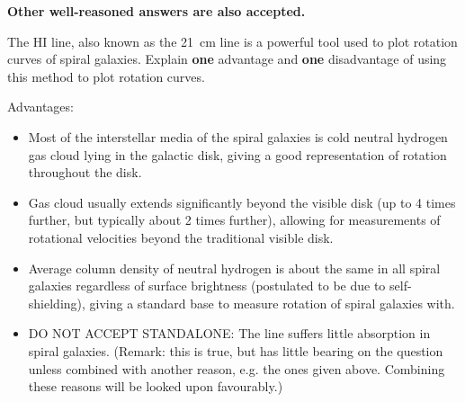 \documentclass[a4paper,11pt]{exam}
\begin{document}
\begin{questions}
\begin{solution}
		\textbf{Other well-reasoned answers are also accepted.}
	\end{solution}
	\vspace*{-10pt}
	

\question[2] 
	The HI line, also known as the \SI{21}{\centi\metre} line is a powerful tool used to plot rotation curves of spiral galaxies. Explain \textbf{one} advantage and \textbf{one} disadvantage of using this method to plot rotation curves.
	\droppoints
	\begin{solution}
		Advantages:
		\begin{itemize}
			\item Most of the interstellar media of the spiral galaxies is cold neutral hydrogen gas cloud lying in the galactic disk, giving a good representation of rotation throughout the disk.
			\item Gas cloud usually extends significantly beyond the visible disk (up to 4 times further, but typically about 2 times further), allowing for measurements of rotational velocities beyond the traditional visible disk.
			\item Average column density of neutral hydrogen is about the same in all spiral galaxies regardless of surface brightness (postulated to be due to self-shielding), giving a standard base to measure rotation of spiral galaxies with.
			\item DO NOT ACCEPT STANDALONE: The  line suffers little absorption in spiral galaxies. (Remark: this is true, but has little bearing on the question unless combined with another reason, e.g. the ones given above. Combining these reasons will be looked upon favourably.)
		\end{itemize}
		

\end{solution}
\end{questions}
\end{document}
